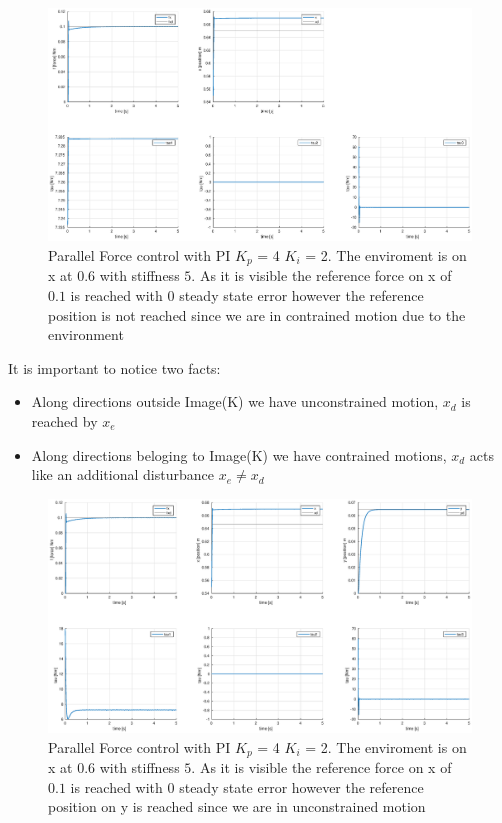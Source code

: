 \documentclass[a4paper,12pt]{article}
\begin{document}
\begin{figure}[H]
    \begin{center}
        \hspace*{-4.5cm}
        \includegraphics[scale=0.5]{images/parallel_pi.eps}
    \end{center}
    \caption{Parallel Force control with PI $K_p$ = 4 $K_i$ = 2. The enviroment is on x at 0.6 with stiffness $5$. As it is visible the reference force on x of $0.1$ is reached with 0 steady state error however the reference position is not reached since we are in contrained motion due to the environment }
    \label{fig:parallel_pi}
\end{figure}

It is important to notice two facts:
\begin{itemize}
    \item Along directions outside Image(K) we have unconstrained motion, $x_d$ is reached by $x_e$
    \item Along directions beloging to Image(K) we have contrained motions, $x_d$ acts like an additional disturbance $x_e \neq x_d$
\end{itemize}
\begin{figure}[H]
    \begin{center}
        \hspace*{-4.5cm}
        \includegraphics[scale=0.5]{images/parallel_constrained.eps}
    \end{center}
    \caption{Parallel Force control with PI $K_p$ = 4 $K_i$ = 2. The enviroment is on x at 0.6 with stiffness $5$. As it is visible the reference force on x of $0.1$ is reached with 0 steady state error however the reference position on y is reached since we are in unconstrained motion }
    \label{fig:parallel_constrained}
\end{figure}
\newpage
\end{document}

